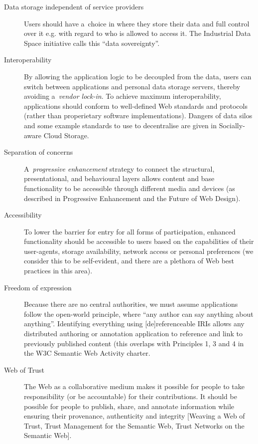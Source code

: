 \documentclass[a4paper]{llncs}
\begin{document}
                            \begin{description}
  \item[Data storage independent of service providers] Users should have a choice in where they store their data and full control over it e.g. with regard to who is allowed to access it. The \empty Industrial Data Space initiative calls this ``data sovereignty''.\item[Interoperability] By allowing the application logic to be decoupled from the data, users can switch between applications and personal data storage servers, thereby avoiding a {\em vendor lock-in}. To achieve maximum interoperability, applications should conform to well-defined Web standards and protocols (rather than properietary software implementations). Dangers of data silos and some example standards to use to decentralise are given in \empty Socially-aware Cloud Storage.\item[Separation of concerns] A {\em progressive enhancement} strategy to connect the structural, presentational, and behavioural layers allows content and base functionality to be accessible through different media and devices (as described in \empty Progressive Enhancement and the Future of Web Design).\item[Accessibility] To lower the barrier for entry for all forms of participation, enhanced functionality should be accessible to users based on the capabilities of their user-agents, storage availability, network access or personal preferences (we consider this to be self-evident, and there are a plethora of Web best practices in this area).\item[Freedom of expression] Because there are no central authorities, we must assume applications follow the open-world principle, where ``any author can say anything about anything''. Identifying everything using [de]referenceable IRIs allows any distributed authoring or annotation application to reference and link to previously published content (this overlaps with Principles 1, 3 and 4 in the \empty W3C Semantic Web Activity charter.\item[Web of Trust] The Web as a collaborative medium makes it possible for people to take responsibility (or be accountable) for their contributions. It should be possible for people to publish, share, and annotate information while ensuring their provenance, authenticity and integrity [\empty Weaving a Web of Trust, \empty Trust Management for the Semantic Web, \empty Trust Networks on the Semantic Web].
    \end{description}
  
\end{document}
